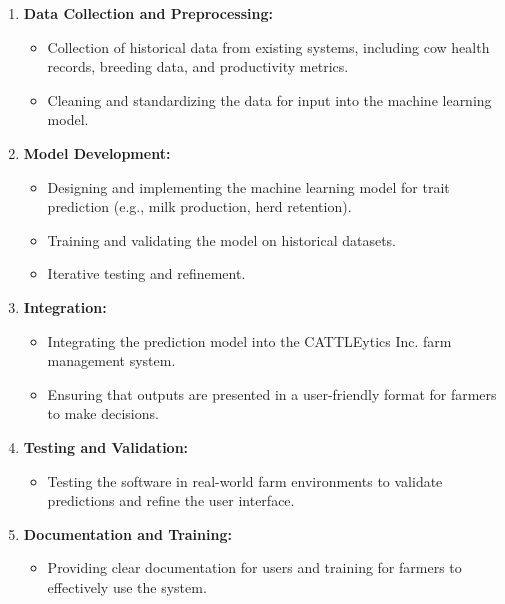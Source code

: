 \documentclass[12pt]{article}
\begin{document}
\begin{enumerate}
    \item \textbf{Data Collection and Preprocessing:}
    \begin{itemize}
        \item Collection of historical data from existing systems, including 
        cow health records, breeding data, and productivity metrics.
        \item Cleaning and standardizing the data for input into the machine 
        learning model.
    \end{itemize}

    \item \textbf{Model Development:}
    \begin{itemize}
        \item Designing and implementing the machine learning model for trait 
        prediction (e.g., milk production, herd retention).
        \item Training and validating the model on historical datasets.
        \item Iterative testing and refinement.
    \end{itemize}

    \item \textbf{Integration:}
    \begin{itemize}
        \item Integrating the prediction model into the CATTLEytics Inc. farm 
        management system.
        \item Ensuring that outputs are presented in a user-friendly format 
        for farmers to make decisions.
    \end{itemize}

    \item \textbf{Testing and Validation:}
    \begin{itemize}
        \item Testing the software in real-world farm environments to validate 
        predictions and refine the user interface.
    \end{itemize}

    \item \textbf{Documentation and Training:}
    \begin{itemize}
        \item Providing clear documentation for users and training for farmers 
        to effectively use the system.
    \end{itemize}
\end{enumerate}
\end{document}
